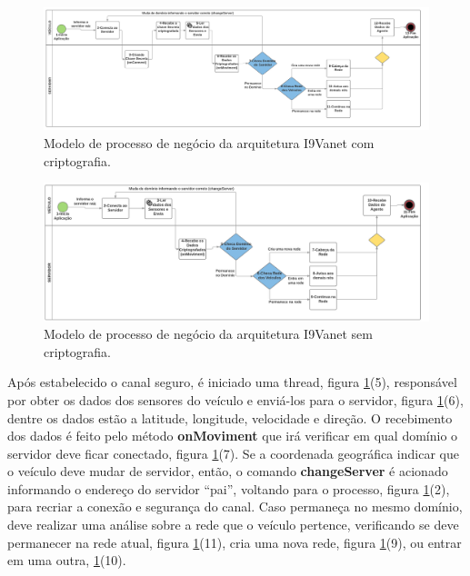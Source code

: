 \documentclass[
	12pt,				%
	oneside,			%
	a4paper,			%
	english,			%
	brazil				%
	]{abntex2ppgsi}
\begin{document}
\begin{figure}[h!]
	\centering
	\includegraphics[width=1.0\columnwidth]{images/BPMCriptofrafado.png}
	\caption{Modelo de processo de negócio da arquitetura I9Vanet com criptografia.}
	\label{fig:bpmcriptografia}
\end{figure}

\begin{figure}[h!]
	\centering
	\includegraphics[width=0.9\columnwidth]{images/BPM.png}
	\caption{Modelo de processo de negócio da arquitetura I9Vanet sem criptografia.}
	\label{fig:bpm}
\end{figure}

Após estabelecido o canal seguro, é iniciado uma thread, figura \ref{fig:bpmcriptografia}(5), responsável por obter os dados dos sensores do veículo e enviá-los para o servidor, figura \ref{fig:bpmcriptografia}(6), dentre os dados estão a latitude, longitude, velocidade e direção. O recebimento dos dados é feito pelo método \textbf{onMoviment} que irá verificar em qual domínio o servidor deve ficar conectado, figura \ref{fig:bpmcriptografia}(7). Se a coordenada geográfica indicar que o veículo deve mudar de servidor, então, o comando \textbf{changeServer} é acionado informando o endereço do servidor ``pai'', voltando para o processo, figura \ref{fig:bpmcriptografia}(2), para recriar a conexão e segurança do canal. Caso permaneça no mesmo domínio, deve realizar uma análise sobre a rede que o veículo pertence, verificando se deve permanecer na rede atual, figura  \ref{fig:bpmcriptografia}(11), cria uma  nova rede, figura \ref{fig:bpmcriptografia}(9), ou entrar em uma outra,  \ref{fig:bpmcriptografia}(10).
\end{document}
